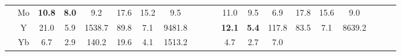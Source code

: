 \documentclass[french,10pt]{article}
\begin{document}
\begin{landscape}
\begin{longtable}{ l  c | c c c | c c c | c c c | c c c | c c c | c c c | }
                    \\*
                        & {\small Mo  }

                    &                     \textbf{ 10.8}
     & {\footnotesize     \textbf{ 8.0}
    } & {\footnotesize     9.2
     }
    
    
                    &                     17.6
     & {\footnotesize     15.2
    } & {\footnotesize     9.5
     }
    
    
                    & & &

                    &                     11.0
     & {\footnotesize     9.5
    } & {\footnotesize     6.9
     }
    
    
                    &                     17.8
     & {\footnotesize     15.6
    } & {\footnotesize     9.0
     }
    
    
                    & & &

                    \\*
                        & {\small Y  }

                    &                     21.0
     & {\footnotesize     5.9
    } & {\footnotesize     1538.7
     }
    
    
                    &                     89.8
     & {\footnotesize     7.1
    } & {\footnotesize     9481.8
     }
    
    
                    & & &

                    &                     \textbf{ 12.1}
     & {\footnotesize     \textbf{ 5.4}
    } & {\footnotesize     117.8
     }
    
    
                    &                     83.5
     & {\footnotesize     7.1
    } & {\footnotesize     8639.2
     }
    
    
                    & & &

                    \\*
                        & {\small Yb  }

                    &                     6.7
     & {\footnotesize     2.9
    } & {\footnotesize     140.2
     }
    
    
                    &                     19.6
     & {\footnotesize     4.1
    } & {\footnotesize     1513.2
     }
    
    
                    & & &

                    &                     4.7
     & {\footnotesize     2.7
    } & {\footnotesize     7.0
     }
    

\end{longtable}
\end{landscape}
\end{document}
